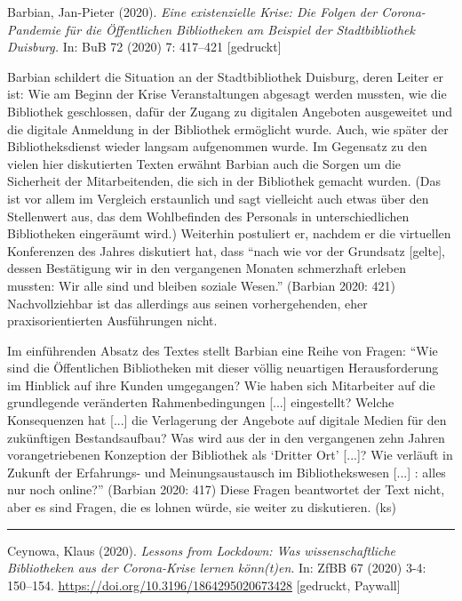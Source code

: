 \documentclass[a4paper,
fontsize=11pt,
oneside,
numbers=noperiodatend,
parskip=half-,
bibliography=totoc,
final
]{scrartcl}
\begin{document}
Barbian, Jan-Pieter (2020). \emph{Eine existenzielle Krise: Die Folgen
der Corona-Pandemie für die Öffentlichen Bibliotheken am Beispiel der
Stadtbibliothek Duisburg.} In: BuB 72 (2020) 7: 417--421 {[}gedruckt{]}

Barbian schildert die Situation an der Stadtbibliothek Duisburg, deren
Leiter er ist: Wie am Beginn der Krise Veranstaltungen abgesagt werden
mussten, wie die Bibliothek geschlossen, dafür der Zugang zu digitalen
Angeboten ausgeweitet und die digitale Anmeldung in der Bibliothek
ermöglicht wurde. Auch, wie später der Bibliotheksdienst wieder langsam
aufgenommen wurde. Im Gegensatz zu den vielen hier diskutierten Texten
erwähnt Barbian auch die Sorgen um die Sicherheit der Mitarbeitenden,
die sich in der Bibliothek gemacht wurden. (Das ist vor allem im
Vergleich erstaunlich und sagt vielleicht auch etwas über den
Stellenwert aus, das dem Wohlbefinden des Personals in unterschiedlichen
Bibliotheken eingeräumt wird.) Weiterhin postuliert er, nachdem er die
virtuellen Konferenzen des Jahres diskutiert hat, dass \enquote{nach wie
vor der Grundsatz {[}gelte{]}, dessen Bestätigung wir in den vergangenen
Monaten schmerzhaft erleben mussten: Wir alle sind und bleiben soziale
Wesen.} (Barbian 2020: 421) Nachvollziehbar ist das allerdings aus
seinen vorhergehenden, eher praxisorientierten Ausführungen nicht.

Im einführenden Absatz des Textes stellt Barbian eine Reihe von Fragen:
\enquote{Wie sind die Öffentlichen Bibliotheken mit dieser völlig
neuartigen Herausforderung im Hinblick auf ihre Kunden umgegangen? Wie
haben sich Mitarbeiter auf die grundlegende veränderten
Rahmenbedingungen {[}...{]} eingestellt? Welche Konsequenzen hat
{[}...{]} die Verlagerung der Angebote auf digitale Medien für den
zukünftigen Bestandsaufbau? Was wird aus der in den vergangenen zehn
Jahren vorangetriebenen Konzeption der Bibliothek als \enquote{Dritter
Ort} {[}...{]}? Wie verläuft in Zukunft der Erfahrungs- und
Meinungsaustausch im Bibliothekswesen {[}...{]} : alles nur noch
online?} (Barbian 2020: 417) Diese Fragen beantwortet der Text nicht,
aber es sind Fragen, die es lohnen würde, sie weiter zu diskutieren.
(ks)

\begin{center}\rule{0.5\linewidth}{0.5pt}\end{center}

Ceynowa, Klaus (2020). \emph{Lessons from Lockdown: Was
wissenschaftliche Bibliotheken aus der Corona-Krise lernen könn(t)en}.
In: ZfBB 67 (2020) 3-4: 150--154.
\url{https://doi.org/10.3196/1864295020673428} {[}gedruckt, Paywall{]}
\end{document}
